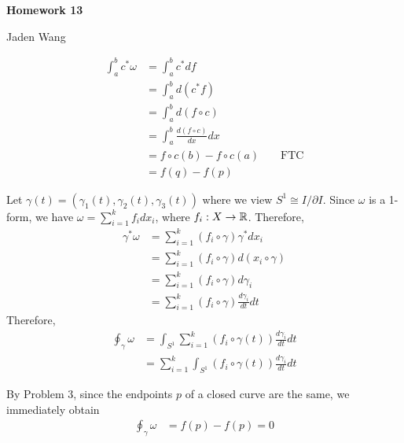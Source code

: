 \documentclass[12pt]{article}
\begin{document}
\centerline {\textsf{\textbf{\LARGE{Homework 13}}}}
\centerline {Jaden Wang}
\vspace{.15in}
\begin{problem}[4.4.3]
\begin{align*}
	\int_{ a}^{ b} c^* \omega &= \int_{ a}^{ b} c^* df  \\ 
	&= \int_{ a}^{ b} d (c^* f)  \\
	&= \int_{ a}^{ b} d(f \circ c)  \\
	&= \int_{ a}^{ b} \frac{d(f \circ c)}{ dx} dx \\
	&= f \circ c(b) - f \circ c(a) &&\text{ FTC}  \\
	&= f(q) - f(p) 
\end{align*}
\end{problem}

\begin{problem}[4.4.5]
Let $ \gamma(t) = ( \gamma_1(t), \gamma_2(t), \gamma_3(t))$ where we view $ S^{1} \cong I / \partial I$. Since $ \omega$ is a 1-form, we have $ \omega = \sum_{ i= 1}^{ k} f_i d x_i$, where $ f_i: X \to \mathbb{R}$. Therefore,
\begin{align*}
	\gamma^* \omega &= \sum_{ i= 1}^{ k} (f_i \circ \gamma) \gamma^* d x_i\\
	&= \sum_{ i= 1}^{ k} (f_i \circ \gamma) d(x_i \circ \gamma) \\
	&= \sum_{ i= 1}^{ k} (f_i \circ \gamma) d \gamma_i \\
	&= \sum_{ i= 1}^{ k} (f_i \circ \gamma) \frac{d \gamma_i}{ dt} dt 
\end{align*}
Therefore,
\begin{align*}
	\oint_{ \gamma} \omega &= \int_{S^{1}} \sum_{ i= 1}^{ k} (f_i \circ \gamma(t)) \frac{d \gamma_i}{ dt} dt \\
&= \sum_{ i= 1}^{ k} \int_{S^{1}} (f_i \circ \gamma(t)) \frac{d \gamma_i}{ dt} dt 
\end{align*}
\end{problem}
\begin{problem}[4.4.7]
By Problem 3, since the endpoints $ p$ of a closed curve are the same, we immediately obtain
\begin{align*}
	\oint_{ \gamma} \omega &= f(p) - f(p) = 0 
\end{align*}
\end{problem}
\end{document}
